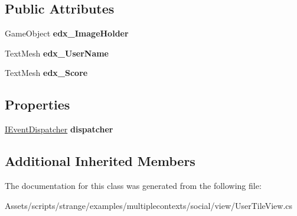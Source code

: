 \subsection*{Public Attributes}
\begin{DoxyCompactItemize}
\item 
\hypertarget{classstrange_1_1examples_1_1multiplecontexts_1_1social_1_1_user_tile_view_a1dad33a1babf0e272d895c933479f98c}{Game\-Object {\bfseries edx\-\_\-\-Image\-Holder}}\label{classstrange_1_1examples_1_1multiplecontexts_1_1social_1_1_user_tile_view_a1dad33a1babf0e272d895c933479f98c}

\item 
\hypertarget{classstrange_1_1examples_1_1multiplecontexts_1_1social_1_1_user_tile_view_a2bff623f56b7bb887033351494780055}{Text\-Mesh {\bfseries edx\-\_\-\-User\-Name}}\label{classstrange_1_1examples_1_1multiplecontexts_1_1social_1_1_user_tile_view_a2bff623f56b7bb887033351494780055}

\item 
\hypertarget{classstrange_1_1examples_1_1multiplecontexts_1_1social_1_1_user_tile_view_a64bf07ad508fd3cf52b248da5761cc47}{Text\-Mesh {\bfseries edx\-\_\-\-Score}}\label{classstrange_1_1examples_1_1multiplecontexts_1_1social_1_1_user_tile_view_a64bf07ad508fd3cf52b248da5761cc47}

\end{DoxyCompactItemize}
\subsection*{Properties}
\begin{DoxyCompactItemize}
\item 
\hypertarget{classstrange_1_1examples_1_1multiplecontexts_1_1social_1_1_user_tile_view_ac3294cf65891afccc5a963ed6bf67077}{\hyperlink{interfacestrange_1_1extensions_1_1dispatcher_1_1eventdispatcher_1_1api_1_1_i_event_dispatcher}{I\-Event\-Dispatcher} {\bfseries dispatcher}}\label{classstrange_1_1examples_1_1multiplecontexts_1_1social_1_1_user_tile_view_ac3294cf65891afccc5a963ed6bf67077}

\end{DoxyCompactItemize}
\subsection*{Additional Inherited Members}


The documentation for this class was generated from the following file\-:\begin{DoxyCompactItemize}
\item 
Assets/scripts/strange/examples/multiplecontexts/social/view/User\-Tile\-View.\-cs\end{DoxyCompactItemize}
